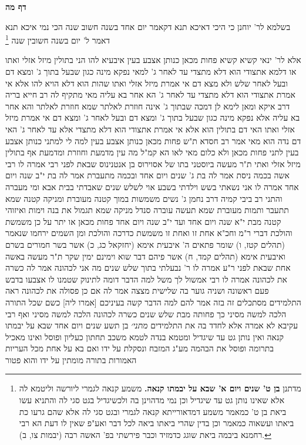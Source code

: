 \documentclass[12pt, openany]{book}
\newcommand{\sethebfont}{
\fontsize{10.5pt}{21.0pt} \selectfont
}
\newcommand{\twocol}[1]{
	{\sethebfont \begin{multicols}{2}
			#1
	\end{multicols}}	
}
\newcommand{\sectname}{}
\newcommand{\newsection}[1]{
	\addcontentsline{toc}{section}{#1}
	\renewcommand{\sectname}{#1}	
	\vspace{-\baselineskip}
	\begin{center}
		\textbf{%
\fontsize{16pt}{16pt}\selectfont
			#1}
	\end{center}
	\vspace{-\baselineskip}
	\nopagebreak
}
\newcommand{\footnotecomment}[1]{\footnote{#1}}
\newcommand{\commenta}[1]{\footnotecomment{#1}}
\begin{document}
\newsection{דף מה}
\twocol{בשלמא לר' יוחנן כי היכי דאיכא תנא דקאמר  יום אחד בשנה חשוב שנה הכי נמי איכא תנא דאמר  ל' יום בשנה חשובין שנה 
\commenta{מדתנן \textbf{בן ט' שנים ויום א' שבא על יבמתו קנאה.}  משמע קנאה לגמרי ליורשה וליטמא לה אלא שאינו נותן גט עד שיגדיל וכן נמי מדהוינן בה ולכשיגדיל בגט סגי לה והתניא עשו ביאת בן ט' כמאמר משמע דמדאורייתא קנאה לגמרי ובגט סגי לה אלא שהם גרעו כת ביאתו ועשאוה כמאמר וכן בדין שהרי ביאתו ביאה לכל דבר ואע"פ שאין לו דעת הא רבי רחמנא ביבמה ביאת שוגג כדמזיד וכבר פירשתי בפ' האשה רבה (יבמות צו, ב). }

אלא לר' ינאי קשיא קשיא
פחות מכאן כנותן אצבע בעין איבעיא להו  הני בתולין מיזל אזלי ואתו או דלמא אתצודי הוא דלא מתצדי עד לאחר ג' 
למאי נפקא מינה  כגון שבעל בתוך ג' ומצא דם ובעל לאחר שלש ולא מצא דם  אי אמרת מיזל אזלי ואתו שהות הוא דלא הויא להו
אלא אי אמרת אתצודי הוא דלא מתצדי עד לאחר ג' הא אחר בא עליה מאי 
מתקיף לה רב חייא בריה דרב איקא  ומאן לימא לן דמכה שבתוך ג' אינה חוזרת לאלתר שמא חוזרת לאלתר והא אחר בא עליה 
אלא נפקא מינה  כגון שבעל בתוך ג' ומצא דם ובעל לאחר ג' ומצא דם  אי אמרת מיזל אזלי ואתו האי דם בתולין הוא אלא אי אמרת אתצודי הוא דלא מתצדי אלא עד לאחר ג' האי דם נדה הוא מאי 
אמר רב חסדא  ת"ש פחות מכאן כנותן אצבע בעין למה לי למתני כנותן אצבע בעין  לתני פחות מכאן ולא כלום מאי לאו הא קמ"ל  מה עין מדמעת וחוזרת ומדמעת אף בתולין מיזל אזלי ואתי 
ת"ר מעשה ביוסטני בתו של אסוירוס בן אנטנינוס שבאת לפני רבי  אמרה לו  רבי אשה בכמה ניסת  אמר לה  בת ג'  שנים ויום אחד 
ובכמה מתעברת  אמר לה  בת י"ב שנה ויום אחד  אמרה לו  אני נשאתי בשש וילדתי בשבע אוי לשלש שנים שאבדתי בבית אבא 
ומי מעברה  והתני רב ביבי קמיה דרב נחמן ג'  נשים משמשות במוך קטנה מעוברת ומניקה 
קטנה שמא תתעבר ותמות מעוברת שמא תעשה עוברה סנדל מניקה שמא תגמול את בנה וימות 
ואיזוהי קטנה מבת י"א שנה ויום אחד ועד י"ב שנה ויום אחד  פחות מכאן או יתר על כן משמשת והולכת דברי ר"מ 
וחכ"א  אחת זו ואחת זו משמשת כדרכה והולכת ומן השמים ירחמו שנאמר (תהלים קטז, ו) שומר פתאים ה' 
איבעית אימא  (יחזקאל כג, כ) אשר בשר חמורים בשרם  ואיבעית אימא  (תהלים קמד, ח) אשר פיהם דבר שוא וימינם ימין שקר 
ת"ר מעשה באשה אחת שבאת לפני ר"ע אמרה לו  ר' נבעלתי בתוך שלש שנים מה אני לכהונה  אמר לה  כשרה את לכהונה 
אמרה לו  רבי אמשול לך משל למה הדבר דומה לתינוק שטמנו לו אצבעו בדבש  פעם ראשונה ושניה גוער בה שלישית מצצה  אמר לה  אם כן פסולה את לכהונה 
ראה התלמידים מסתכלים זה בזה  אמר להם  למה הדבר קשה בעיניכם  [אמרו ליה]  כשם שכל התורה הלכה למשה מסיני כך פחותה מבת שלש שנים כשרה לכהונה הלכה למשה מסיני  ואף רבי עקיבא לא אמרה אלא לחדד בה את התלמידים
{\large\emph{מתני׳}} בן תשע שנים ויום אחד שבא על יבמתו קנאה ואין נותן גט עד שיגדיל
ומטמא בנדה לטמא משכב תחתון כעליון 
ופוסל ואינו מאכיל בתרומה ופוסל את הבהמה מע"ג המזבח ונסקלת על ידו  ואם בא על אחת מכל העריות האמורות בתורה מומתין על ידו והוא פטור
}
\end{document}
